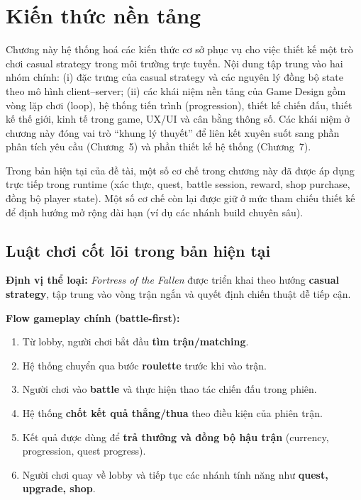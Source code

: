 ﻿\section{Kiến thức nền tảng}

Chương này hệ thống hoá các kiến thức cơ sở phục vụ cho việc thiết kế một trò chơi casual strategy trong môi trường trực tuyến. Nội dung tập trung vào hai nhóm chính: (i) đặc trưng của casual strategy và các nguyên lý đồng bộ state theo mô hình client--server; (ii) các khái niệm nền tảng của Game Design gồm vòng lặp chơi (loop), hệ thống tiến trình (progression), thiết kế chiến đấu, thiết kế thế giới, kinh tế trong game, UX/\allowbreak UI và cân bằng thông số\cite{adams-game-design,schell-art}. Các khái niệm ở chương này đóng vai trò ``khung lý thuyết'' để liên kết xuyên suốt sang phần phân tích yêu cầu (Chương~5) và phần thiết kế hệ thống (Chương~7).

Trong bản hiện tại của đề tài, một số cơ chế trong chương này đã được áp dụng trực tiếp trong runtime (xác thực, quest, battle session, reward, shop purchase, đồng bộ player state). Một số cơ chế còn lại được giữ ở mức tham chiếu thiết kế để định hướng mở rộng dài hạn (ví dụ các nhánh build chuyên sâu).

\subsection{Luật chơi cốt lõi trong bản hiện tại}

\textbf{Định vị thể loại:} \textit{Fortress of the Fallen} được triển khai theo hướng \textbf{casual strategy}, tập trung vào vòng trận ngắn và quyết định chiến thuật dễ tiếp cận.

\textbf{Flow gameplay chính (battle-first):}
\begin{enumerate}
    \item Từ lobby, người chơi bắt đầu \textbf{tìm trận/matching}.
    \item Hệ thống chuyển qua bước \textbf{roulette} trước khi vào trận.
    \item Người chơi vào \textbf{battle} và thực hiện thao tác chiến đấu trong phiên.
    \item Hệ thống \textbf{chốt kết quả thắng/thua} theo điều kiện của phiên trận.
    \item Kết quả được dùng để \textbf{trả thưởng và đồng bộ hậu trận} (currency, progression, quest progress).
    \item Người chơi quay về lobby và tiếp tục các nhánh tính năng như \textbf{quest, upgrade, shop}.
\end{enumerate}

